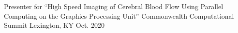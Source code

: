 

\begin{cventries}

  \cventry
    {Presenter for “High Speed Imaging of Cerebral Blood Flow Using Parallel Computing on the Graphics Processing Unit” } %
    {Commonwealth Computational Summit} %
    {Lexington, KY} %
    {Oct. 2020} %
    {
      \begin{cvitems} %
      \end{cvitems}
    }

\end{cventries}
